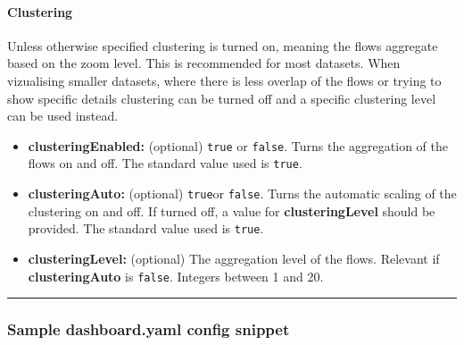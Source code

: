 \hypertarget{clustering}{%
\paragraph{Clustering}\label{clustering}}

Unless otherwise specified clustering is turned on, meaning the flows
aggregate based on the zoom level. This is recommended for most
datasets. When vizualising smaller datasets, where there is less overlap
of the flows or trying to show specific details clustering can be turned
off and a specific clustering level can be used instead.

\begin{itemize}
\tightlist
\item
  \textbf{clusteringEnabled:} (optional) \texttt{true} or
  \texttt{false}. Turns the aggregation of the flows on and off. The
  standard value used is \texttt{true}.
\item
  \textbf{clusteringAuto:} (optional) \texttt{true}or \texttt{false}.
  Turns the automatic scaling of the clustering on and off. If turned
  off, a value for \textbf{clusteringLevel} should be provided. The
  standard value used is \texttt{true}.
\item
  \textbf{clusteringLevel:} (optional) The aggregation level of the
  flows. Relevant if \textbf{clusteringAuto} is \texttt{false}. Integers
  between 1 and 20.
\end{itemize}

\begin{center}\rule{0.5\linewidth}{0.5pt}\end{center}

\hypertarget{sample-dashboard.yaml-config-snippet}{%
\subsubsection{Sample dashboard.yaml config
snippet}\label{sample-dashboard.yaml-config-snippet}}

